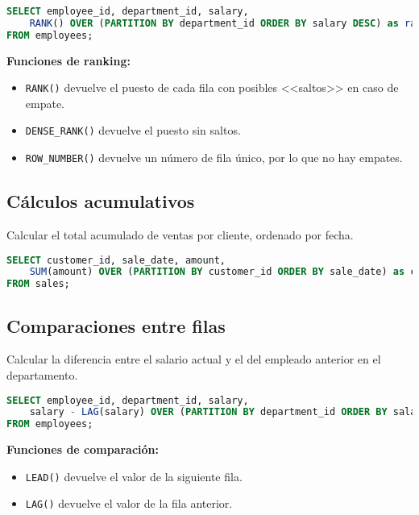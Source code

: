 \begin{lstlisting}[language=SQL]
SELECT employee_id, department_id, salary,
    RANK() OVER (PARTITION BY department_id ORDER BY salary DESC) as rank
FROM employees;
\end{lstlisting}

\textbf{Funciones de ranking:}

\begin{itemize}
    \item \texttt{RANK()} devuelve el puesto de cada fila con posibles <<saltos>> en caso de empate.
    \item \texttt{DENSE\_RANK()} devuelve el puesto sin saltos.
    \item \texttt{ROW\_NUMBER()} devuelve un número de fila único, por lo que no hay empates.
\end{itemize}

\subsection{Cálculos acumulativos}

Calcular el total acumulado de ventas por cliente, ordenado por fecha.

\begin{lstlisting}[language=SQL]
SELECT customer_id, sale_date, amount,
    SUM(amount) OVER (PARTITION BY customer_id ORDER BY sale_date) as cumulative_total
FROM sales;
\end{lstlisting}

\subsection{Comparaciones entre filas}

Calcular la diferencia entre el salario actual y el del empleado anterior
en el departamento.

\begin{lstlisting}[language=SQL]
SELECT employee_id, department_id, salary,
    salary - LAG(salary) OVER (PARTITION BY department_id ORDER BY salary) as salary_diff
FROM employees;
\end{lstlisting}

\textbf{Funciones de comparación:}

\begin{itemize}
    \item \texttt{LEAD()} devuelve el valor de la siguiente fila.
    \item \texttt{LAG()} devuelve el valor de la fila anterior.
\end{itemize}

